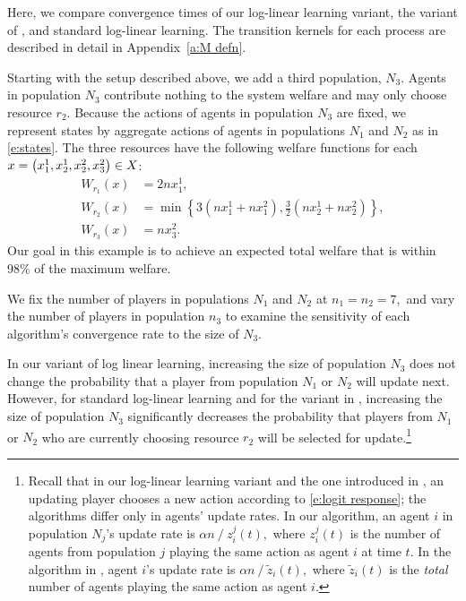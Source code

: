 \begin{example}\label{e:compare to SS}

Here, we compare convergence times of our log-linear learning variant, the variant of \cite{Shah2010}, and standard log-linear learning. The transition kernels for each process are described in detail in Appendix~\ref{a:M defn}.


Starting with the setup described above,
we add a third population, $N_3$. Agents in population $N_3$ contribute nothing to the system welfare and may only choose resource $r_2.$ Because the actions of agents in population $N_3$ are fixed, we represent states by aggregate actions of agents in populations $N_1$ and $N_2$ as in \eqref{e:states}.
The three resources have the following welfare functions for each $x = \left(x_1^1,x_2^1,x_2^2,x_3^2\right)\in X$:
\begin{align*}
W_{r_1}(x) &= 2nx_1^1,\\
W_{r_2}(x) &= \min\left\{3(nx_1^1+nx_1^2),\frac{3}{2}(nx_2^1+nx_2^2)\right\},\\
W_{r_3}(x) &= nx_3^2.\label{e:ex welfare functions}
\end{align*}
Our goal in this example is to achieve an expected total welfare that is within 98\% of the maximum welfare.


We fix the number of players in populations $N_1$ and $N_2$ at $n_1 = n_2 = 7,$ and vary the number of players in population $n_3$ to examine the sensitivity of each algorithm's convergence rate to the size of $N_3$.

In our variant of log linear learning, increasing the size of population $N_3$ does not change the probability that a player from population $N_1$ or $N_2$ will update next.
However, for standard log-linear learning and for the variant in \cite{Shah2010}, increasing the size of population $N_3$ significantly decreases the probability that players from $N_1$ or $N_2$ who are currently choosing resource $r_2$ will be selected for update.\footnote{Recall that in our log-linear learning variant and the one introduced in \cite{Shah2010}, an updating player chooses a new action according to \eqref{e:logit response}; the algorithms differ only in agents' update rates. In our algorithm, an agent $i$ in population $N_j$'s update rate is $\alpha n\mathop{/}z_i^j(t),$ where $z_i^j(t)$ is the number of agents from population $j$ playing the same action as agent $i$ at time $t.$ In the algorithm in \cite{Shah2010}, agent $i$'s update rate is $\alpha n\mathop{/}\tilde{z}_i(t),$ where $\tilde{z}_i(t)$ is the \emph{total} number of agents playing the same action as agent $i$.}


\end{example}
